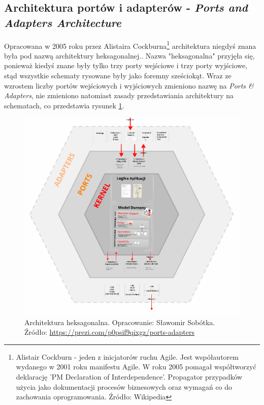 \subsection{Architektura portów i adapterów - \textit{Ports and Adapters Architecture}}
Opracowana w 2005 roku przez Alistaira Cockburna\footnote{Alistair Cockburn - jeden z inicjatorów ruchu Agile. Jest współautorem wydanego w 2001 roku manifestu Agile. W roku 2005 pomagał współtworzyć deklarację 'PM Declaration of Interdependence'. Propagator przypadków użycia jako dokumentacji procesów biznesowych oraz wymagań co do zachowania oprogramowania. Źródło: Wikipedia} architektura niegdyś znana była pod nazwą architektury heksagonalnej.\cite{website:architect:hexagonal}. Nazwa "heksagonalna" przyjęła się, ponieważ kiedyś znane były tylko trzy porty wejściowe i trzy porty wyjściowe, stąd wszystkie schematy rysowane były jako foremny sześciokąt. Wraz ze wzrostem liczby portów wejściowych i wyjściowych zmieniono nazwę na \textit{Ports \& Adapters}, nie zmieniono natomiast zasady przedstawiania architektury na schematach, co przedstawia rysunek \ref{fig:hexagonal_architecture}.

\begin{figure}[!htb]
    \centering
    \includegraphics[width=13cm]{imgs/ch4_hexagonal_architecture_2.png}
    \caption
{Architektura heksagonalna. Opracowanie: Sławomir Sobótka. Źródło: \url{https://prezi.com/p0psif9qixgz/ports-adapters}}
    \label{fig:hexagonal_architecture}
\end{figure} 

